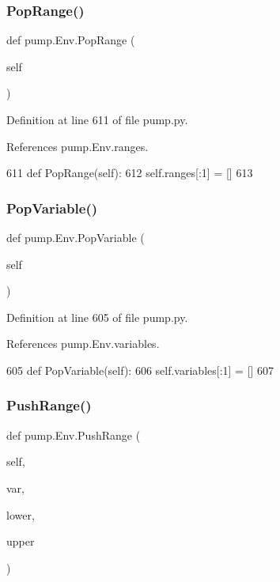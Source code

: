 \subsubsection{\texorpdfstring{Pop\+Range()}{PopRange()}}
{\footnotesize\ttfamily def pump.\+Env.\+Pop\+Range (\begin{DoxyParamCaption}\item[{}]{self }\end{DoxyParamCaption})}



Definition at line 611 of file pump.\+py.



References pump.\+Env.\+ranges.


\begin{DoxyCode}
611   \textcolor{keyword}{def }PopRange(self):
612     self.ranges[:1] = []
613 
\end{DoxyCode}
\mbox{\label{classpump_1_1Env_abf35f8b971acedb275bb92bb29fcd587}} 
\subsubsection{\texorpdfstring{Pop\+Variable()}{PopVariable()}}
{\footnotesize\ttfamily def pump.\+Env.\+Pop\+Variable (\begin{DoxyParamCaption}\item[{}]{self }\end{DoxyParamCaption})}



Definition at line 605 of file pump.\+py.



References pump.\+Env.\+variables.


\begin{DoxyCode}
605   \textcolor{keyword}{def }PopVariable(self):
606     self.variables[:1] = []
607 
\end{DoxyCode}
\mbox{\label{classpump_1_1Env_a600c34cac1e4ba75406efeadb2d7dd95}} 
\subsubsection{\texorpdfstring{Push\+Range()}{PushRange()}}
{\footnotesize\ttfamily def pump.\+Env.\+Push\+Range (\begin{DoxyParamCaption}\item[{}]{self,  }\item[{}]{var,  }\item[{}]{lower,  }\item[{}]{upper }\end{DoxyParamCaption})}



